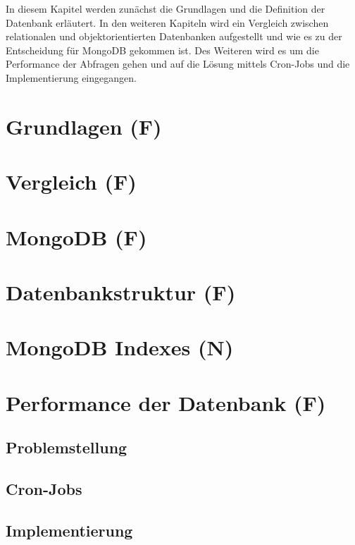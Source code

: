 In diesem Kapitel werden zunächst die Grundlagen und die Definition der Datenbank erläutert. In den weiteren Kapiteln wird ein Vergleich zwischen relationalen und objektorientierten Datenbanken aufgestellt und wie es zu der Entscheidung für MongoDB gekommen ist. Des Weiteren wird es um die Performance der Abfragen gehen und auf die Lösung mittels Cron-Jobs und die Implementierung eingegangen.

\section{Grundlagen (F)}


\section{Vergleich (F)}


\section{MongoDB (F)}


\section{Datenbankstruktur (F)}


\section{MongoDB Indexes (N)}


\section{Performance der Datenbank (F)}


\subsection{Problemstellung}


\subsection{Cron-Jobs}


\subsection{Implementierung}
